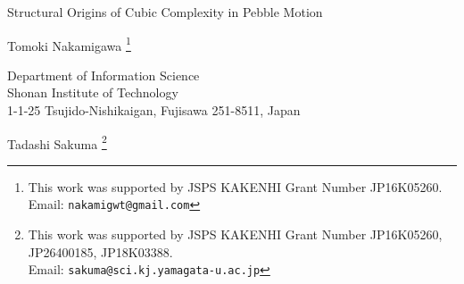 \documentclass[letter,11pt]{article}
\theoremstyle{definition}
\theoremstyle{definition}
\newcommand{\1}{\boldmath$~1~$\unboldmath}
\begin{document}
\thispagestyle{empty}

\begin{center}
 {\Large Structural Origins of Cubic Complexity in Pebble Motion}
\end{center}

\begin{center}
{\large Tomoki Nakamigawa
\footnote{This work was supported by JSPS KAKENHI Grant Number JP16K05260.\\
Email: {\texttt{nakamigwt@gmail.com}}}
}
\end{center}
\begin{center}
{
Department of Information Science \\%
Shonan Institute of Technology \\%
1-1-25 Tsujido-Nishikaigan, Fujisawa 251-8511, Japan
}
\end{center}
\begin{center}
{\large Tadashi Sakuma
\footnote{This work was supported by JSPS KAKENHI Grant Number JP16K05260, JP26400185, JP18K03388.\\
Email: {\texttt{sakuma@sci.kj.yamagata-u.ac.jp}}}
}
\end{center}
\end{document}
